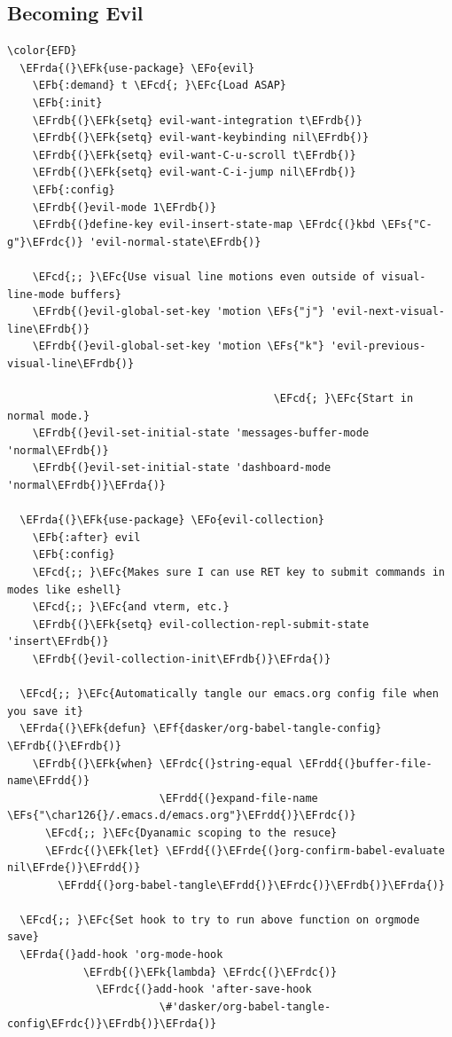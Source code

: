 \documentclass[11pt]{article}
\newcommand{\EFc}[1]{\textcolor{EFc}{#1}} %
\newcommand{\EFcd}[1]{\textcolor{EFcd}{#1}} %
\newcommand{\EFs}[1]{\textcolor{EFs}{#1}} %
\newcommand{\EFk}[1]{\textcolor{EFk}{#1}} %
\newcommand{\EFb}[1]{\textcolor{EFb}{#1}} %
\newcommand{\EFf}[1]{\textcolor{EFf}{#1}} %
\newcommand{\EFo}[1]{\textcolor{EFo}{#1}} %
\newcommand{\EFrda}[1]{\textcolor{EFrda}{#1}} %
\newcommand{\EFrdb}[1]{\textcolor{EFrdb}{#1}} %
\newcommand{\EFrdc}[1]{\textcolor{EFrdc}{#1}} %
\newcommand{\EFrdd}[1]{\textcolor{EFrdd}{#1}} %
\newcommand{\EFrde}[1]{\textcolor{EFrde}{#1}} %
\begin{document}
\subsection{Becoming Evil}
\label{sec:orgf5e180e}
\begin{Code}
\begin{Verbatim}
\color{EFD}
  \EFrda{(}\EFk{use-package} \EFo{evil}
    \EFb{:demand} t \EFcd{; }\EFc{Load ASAP}
    \EFb{:init}
    \EFrdb{(}\EFk{setq} evil-want-integration t\EFrdb{)}
    \EFrdb{(}\EFk{setq} evil-want-keybinding nil\EFrdb{)}
    \EFrdb{(}\EFk{setq} evil-want-C-u-scroll t\EFrdb{)}
    \EFrdb{(}\EFk{setq} evil-want-C-i-jump nil\EFrdb{)}
    \EFb{:config}
    \EFrdb{(}evil-mode 1\EFrdb{)}
    \EFrdb{(}define-key evil-insert-state-map \EFrdc{(}kbd \EFs{"C-g"}\EFrdc{)} 'evil-normal-state\EFrdb{)}

    \EFcd{;; }\EFc{Use visual line motions even outside of visual-line-mode buffers}
    \EFrdb{(}evil-global-set-key 'motion \EFs{"j"} 'evil-next-visual-line\EFrdb{)}
    \EFrdb{(}evil-global-set-key 'motion \EFs{"k"} 'evil-previous-visual-line\EFrdb{)}

                                          \EFcd{; }\EFc{Start in normal mode.}
    \EFrdb{(}evil-set-initial-state 'messages-buffer-mode 'normal\EFrdb{)}
    \EFrdb{(}evil-set-initial-state 'dashboard-mode 'normal\EFrdb{)}\EFrda{)}

  \EFrda{(}\EFk{use-package} \EFo{evil-collection}
    \EFb{:after} evil
    \EFb{:config}
    \EFcd{;; }\EFc{Makes sure I can use RET key to submit commands in modes like eshell}
    \EFcd{;; }\EFc{and vterm, etc.}
    \EFrdb{(}\EFk{setq} evil-collection-repl-submit-state 'insert\EFrdb{)}
    \EFrdb{(}evil-collection-init\EFrdb{)}\EFrda{)}

  \EFcd{;; }\EFc{Automatically tangle our emacs.org config file when you save it}
  \EFrda{(}\EFk{defun} \EFf{dasker/org-babel-tangle-config} \EFrdb{(}\EFrdb{)}
    \EFrdb{(}\EFk{when} \EFrdc{(}string-equal \EFrdd{(}buffer-file-name\EFrdd{)}
                        \EFrdd{(}expand-file-name \EFs{"\char126{}/.emacs.d/emacs.org"}\EFrdd{)}\EFrdc{)}
      \EFcd{;; }\EFc{Dyanamic scoping to the resuce}
      \EFrdc{(}\EFk{let} \EFrdd{(}\EFrde{(}org-confirm-babel-evaluate nil\EFrde{)}\EFrdd{)}
        \EFrdd{(}org-babel-tangle\EFrdd{)}\EFrdc{)}\EFrdb{)}\EFrda{)}

  \EFcd{;; }\EFc{Set hook to try to run above function on orgmode save}
  \EFrda{(}add-hook 'org-mode-hook
            \EFrdb{(}\EFk{lambda} \EFrdc{(}\EFrdc{)}
              \EFrdc{(}add-hook 'after-save-hook
                        \#'dasker/org-babel-tangle-config\EFrdc{)}\EFrdb{)}\EFrda{)}

\end{Verbatim}
\end{Code}
\end{document}
